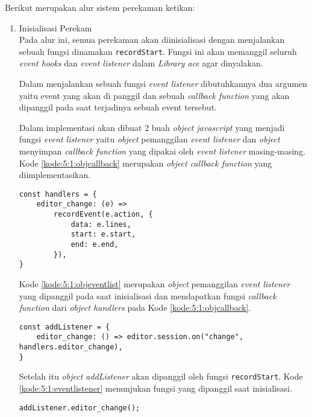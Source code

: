 Berikut merupakan alur sistem perekaman ketikan:
\begin{enumerate}
    \item Inisialisasi Perekam \\
    Pada alur ini, semua perekaman akan diinisialisasi dengan menjalankan sebuah fungsi dinamakan \verb|recordStart|. Fungsi ini akan memanggil seluruh \textit{event hooks} dan \textit{event listener} dalam \textit{Library ace} agar dinyalakan. 
    
    Dalam menjalankan sebuah fungsi \textit{event listener} dibutuhkannya dua argumen yaitu event yang akan di panggil dan sebuah \textit{callback function} yang akan dipanggil pada saat terjadinya sebuah event tersebut. 
    
    Dalam implementasi akan dibuat 2 buah \textit{object javascript} yang menjadi fungsi \textit{event listener} yaitu \textit{object} pemanggilan \textit{event listener} dan \textit{object} menyimpan \textit{callback function} yang dipakai oleh \textit{event listener} masing-masing. Kode \ref{kode:5:1:objcallback} merupakan \textit{object callback function} yang diimplementasikan.
    \begin{lstlisting}[caption={\textit{object callback function}}, label={kode:5:1:objcallback}]
const handlers = {
    editor_change: (e) =>
        recordEvent(e.action, {
            data: e.lines,
            start: e.start,
            end: e.end,
        }),
}
    \end{lstlisting}
    
    Kode \ref{kode:5:1:objeventlist} merupakan \textit{object} pemanggilan \textit{event listener} yang dipanggil pada saat inisialisasi dan mendapatkan fungsi \textit{callback function} dari \textit{object handlers} pada Kode \ref{kode:5:1:objcallback}.
    \begin{lstlisting}[caption={\textit{object event listener}}, label={kode:5:1:objeventlist}]
const addListener = {
    editor_change: () => editor.session.on("change", handlers.editor_change),
}
    \end{lstlisting}

    Setelah itu \textit{object addListener} akan dipanggil oleh fungsi \verb|recordStart|. Kode \ref{kode:5:1:eventlistener} menunjukan fungsi yang dipanggil saat inisialisasi. 
    
    
    \begin{lstlisting}[caption={Beberapa \textit{event listener} yang dipanggil}, label={kode:5:1:eventlistener}]
addListener.editor_change();
    \end{lstlisting}
    

\end{enumerate}
